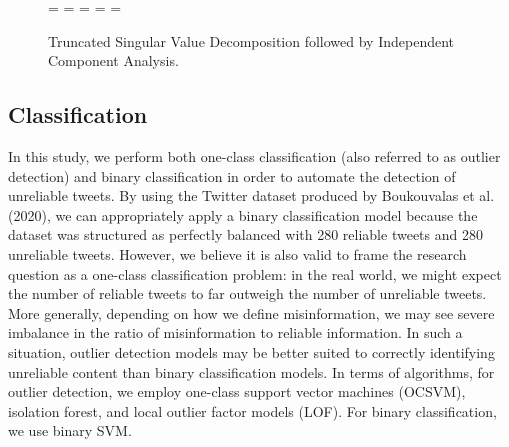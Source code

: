 \documentclass{article}
\begin{document}
\begin{figure}
  \centering
   = 
   
  \newline
  \newline
  \newline
    = 
  \newline
  \newline
  \newline
  {} = 
   
  \newline
  \newline
  \newline
   = 
   
  \newline
  \newline
  \newline
   = 
   
  \caption{Truncated Singular Value Decomposition followed by Independent Component Analysis.}
  \label{fig:matdec}
\end{figure}

\hypertarget{classification}{%
\subsection{Classification}\label{classification}}

In this study, we perform both one-class classification (also referred
to as outlier detection) and binary classification in order to automate
the detection of unreliable tweets. By using the Twitter dataset
produced by Boukouvalas et al. (2020), we can appropriately apply a
binary classification model because the dataset was structured as
perfectly balanced with 280 reliable tweets and 280 unreliable tweets.
However, we believe it is also valid to frame the research question as a
one-class classification problem: in the real world, we might expect the
number of reliable tweets to far outweigh the number of unreliable
tweets. More generally, depending on how we define misinformation, we
may see severe imbalance in the ratio of misinformation to reliable
information. In such a situation, outlier detection models may be better
suited to correctly identifying unreliable content than binary
classification models. In terms of algorithms, for outlier detection, we
employ one-class support vector machines (OCSVM), isolation forest, and
local outlier factor models (LOF). For binary classification, we use
binary SVM.
\end{document}
